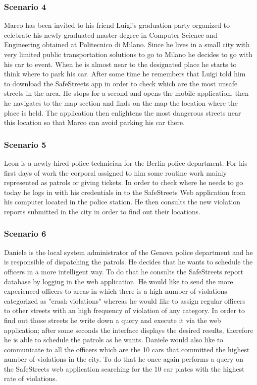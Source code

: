 \subsubsection{Scenario 4}
Marco has been invited to his friend Luigi's graduation party organized to celebrate his newly graduated master degree in Computer Science and Engineering obtained at Politecnico di Milano. Since he lives in a small city with very limited public transportation solutions to go to Milano he decides to go with his car to event. When he is almost near to the designated place he starts to think where to park his car. After some time he remembers that Luigi told him to download the SafeStreets app in order to check which are the most unsafe streets in the area. He stops for a second and opens the mobile application, then he navigates to the map section and finds on the map the location where the place is held.  The application then enlightens the most dangerous streets near this location so that Marco can avoid parking his car there.

\subsubsection{Scenario 5}
Leon is a newly hired police technician for the Berlin police department. For his first days of work the corporal assigned to him some routine work mainly represented as patrols or giving tickets. In order to check where he needs to go today he logs in with his credentials in to the SafeStreets Web application from his computer located in the police station. He then consults the new violation reports submitted in the city in order to find out their locations. 

\subsubsection{Scenario 6}
Daniele is the local system administrator of the Genova police department and he is responsible of dispatching the patrols. He decides that he wants to schedule the officers in a more intelligent way. To do that he consults the SafeStreets report database by logging in the web application. He would like to send the more experienced officers to areas in which there is a high number of violations categorized as "crash violations" whereas he would like to assign regular officers to other streets with an high frequency of violation of any category. In order to find out those streets he write down a query and execute it via the web application; after some seconds the interface displays the desired results, therefore he is able to schedule the patrols as he wants. Daniele would also like to communicate to all the officers which are the 10 cars that committed the highest number of violations in the city. To do that he once again performs a query on the SafeStreets web application searching for the 10 car plates with the highest rate of violations.


